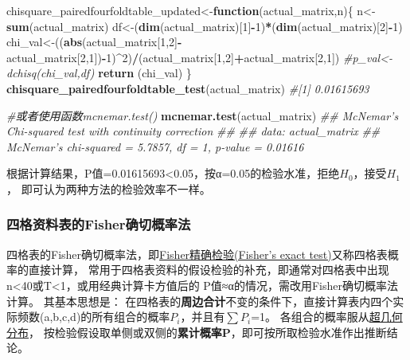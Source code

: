 \documentclass[
]{article}
\newenvironment{Shaded}{\begin{snugshade}}{\end{snugshade}}
\newcommand{\CommentTok}[1]{\textcolor[rgb]{0.56,0.35,0.01}{\textit{#1}}}
\newcommand{\ControlFlowTok}[1]{\textcolor[rgb]{0.13,0.29,0.53}{\textbf{#1}}}
\newcommand{\DecValTok}[1]{\textcolor[rgb]{0.00,0.00,0.81}{#1}}
\newcommand{\KeywordTok}[1]{\textcolor[rgb]{0.13,0.29,0.53}{\textbf{#1}}}
\newcommand{\NormalTok}[1]{#1}
\newcommand{\OperatorTok}[1]{\textcolor[rgb]{0.81,0.36,0.00}{\textbf{#1}}}
\begin{document}
\begin{Shaded}
\begin{Highlighting}[]
\NormalTok{chisquare_pairedfourfoldtable_updated<-}\ControlFlowTok{function}\NormalTok{(actual_matrix,n)\{}
\NormalTok{     n<-}\KeywordTok{sum}\NormalTok{(actual_matrix)}
\NormalTok{     df<-(}\KeywordTok{dim}\NormalTok{(actual_matrix)[}\DecValTok{1}\NormalTok{]}\OperatorTok{-}\DecValTok{1}\NormalTok{)}\OperatorTok{*}\NormalTok{(}\KeywordTok{dim}\NormalTok{(actual_matrix)[}\DecValTok{2}\NormalTok{]}\OperatorTok{-}\DecValTok{1}\NormalTok{)}
\NormalTok{     chi_val<-((}\KeywordTok{abs}\NormalTok{(actual_matrix[}\DecValTok{1}\NormalTok{,}\DecValTok{2}\NormalTok{]}\OperatorTok{-}\NormalTok{actual_matrix[}\DecValTok{2}\NormalTok{,}\DecValTok{1}\NormalTok{])}\OperatorTok{-}\DecValTok{1}\NormalTok{)}\OperatorTok{^}\DecValTok{2}\NormalTok{)}\OperatorTok{/}\NormalTok{(actual_matrix[}\DecValTok{1}\NormalTok{,}\DecValTok{2}\NormalTok{]}\OperatorTok{+}\NormalTok{actual_matrix[}\DecValTok{2}\NormalTok{,}\DecValTok{1}\NormalTok{])}
          \CommentTok{#p_val<-dchisq(chi_val,df)}
     \KeywordTok{return}\NormalTok{ (chi_val)}
\NormalTok{\}}
\KeywordTok{chisquare_pairedfourfoldtable_test}\NormalTok{(actual_matrix)}
\CommentTok{#[1] 0.01615693}

\CommentTok{#或者使用函数mcnemar.test()}
\KeywordTok{mcnemar.test}\NormalTok{(actual_matrix)}
\CommentTok{##      McNemar's Chi-squared test with continuity correction}
\CommentTok{##  }
\CommentTok{##  data:  actual_matrix}
\CommentTok{##  McNemar's chi-squared = 5.7857, df = 1, p-value = 0.01616}
\end{Highlighting}
\end{Shaded}

根据计算结果，P值=0.01615693\textless0.05，按α=0.05的检验水准，拒绝\(H_0\)，接受\(H_1\)，
即可认为两种方法的检验效率不一样。

\hypertarget{ux56dbux683cux8d44ux6599ux8868ux7684fisherux786eux5207ux6982ux7387ux6cd5}{%
\subsubsection{四格资料表的Fisher确切概率法}\label{ux56dbux683cux8d44ux6599ux8868ux7684fisherux786eux5207ux6982ux7387ux6cd5}}

四格表的Fisher确切概率法，即\href{https://en.wikipedia.org/wiki/Fisher\%27s_exact_test}{Fisher精确检验(Fisher's exact test)}又称四格表概率的直接计算，
常用于四格表资料的假设检验的补充，即通常对四格表中出现n\textless40或T\textless1，或用经典计算卡方值后的 P值≈α的情况，需改用Fisher确切概率法计算。
其基本思想是： 在四格表的\textbf{周边合计}不变的条件下，直接计算表内四个实际频数(a,b,c,d)的所有组合的概率\(P_i\)，并且有\(\sum{P_i}\)=1。
各组合的概率服从\href{https://zh.wikipedia.org/zh-hans/\%E8\%B6\%85\%E5\%87\%A0\%E4\%BD\%95\%E5\%88\%86\%E5\%B8\%83}{超几何分布}，
按检验假设取单侧或双侧的\textbf{累计概率P}，即可按所取检验水准作出推断结论。
\end{document}

